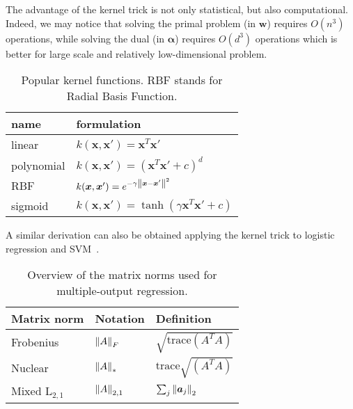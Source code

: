 			The advantage of the kernel trick is not only statistical, but also computational. Indeed, we may notice that solving the primal problem (\ie in $\bm{w}$) requires $O(n^3)$ operations, while solving the dual (\ie in $\bm{\alpha}$) requires $O(d^3)$ operations which is better for large scale and relatively low-dimensional problem.

    	 \begin{table}[htb]
				\centering
				\caption{Popular kernel functions. \ac{RBF} stands for Radial Basis Function.}
				\label{tab:kernels}
				\begin{tabular}{@{}ll@{}}
					\toprule
					name       & formulation                                            \\ \midrule
					linear     & $k(\bm{x}, \bm{x}') =\bm{x}^T\bm{x}' $                               \\
					polynomial & $k(\bm{x},\bm{x}') = (\bm{x}^T\bm{x}' + c)^d$    \\
					RBF        & $k(\bm{x},\bm{x}') = e^{-\gamma\left\lVert\bm{x} - \bm{x}'\right\rVert^2}$ \\
					sigmoid    & $k(\bm{x},\bm{x}') = \tanh(\gamma \bm{x}^T\bm{x}' + c)$ \\ \bottomrule
				\end{tabular}
			\end{table}

			A similar derivation can also be obtained applying the kernel trick to logistic regression and SVM~\cite{bishop2006pattern, shawe2004kernel}.
			
    	\begin{table}[htb]
			\centering
			\caption{Overview of the matrix norms used for multiple-output regression.}\label{tab:norms}
			\begin{tabular}{l|l|l}
				\toprule
				Matrix norm  & Notation         & Definition                      \\  \midrule
				Frobenius        & $\left\lVert A\right\rVert_F$     & $\sqrt{\text{trace}(A^TA)}$     \\ [0.05cm]
				Nuclear          & $\left\lVert A\right\rVert_*$     & $\text{trace}\sqrt{(A^TA)}$     \\ [0.05cm]
				Mixed $\text{L}_{2,1}$        & $\left\lVert A\right\rVert_{2,1}$ & $\sum_{j}\left\lVert\bm{a}_j\right\rVert_2$ \\ \bottomrule
			\end{tabular}
		\end{table}	

